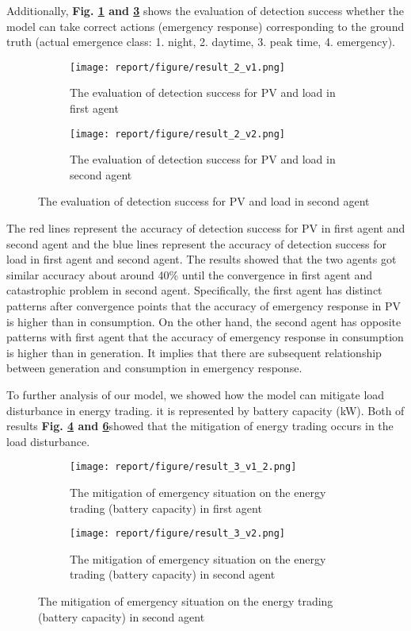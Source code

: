 \documentclass[conference]{IEEEtran}
\begin{document}
Additionally, \textbf{Fig. \ref{fig4} and \ref{fig5}} shows the evaluation of detection success whether the model can take correct actions (emergency response) corresponding to the ground truth (actual emergence class: 1. night, 2. daytime, 3. peak time, 4. emergency). 
\begin{figure}[htp]
\begin{subfigure}{0.45\columnwidth}
  \texttt{[image: report/figure/result\_2\_v1.png]}
  \caption{The evaluation of detection success for PV and load in first agent}
  \label{fig4}
\end{subfigure}
\hfill
\begin{subfigure}{0.45\columnwidth}
  \texttt{[image: report/figure/result\_2\_v2.png]}
  \caption{The evaluation of detection success for PV and load in second agent}
  \label{fig5}
\end{subfigure}
\end{figure}
The red lines represent the accuracy of detection success for PV in first agent and second agent and the blue lines represent the accuracy of detection success for load in first agent and second agent. The results showed that the two agents got similar accuracy about around 40\% until the convergence in first agent and catastrophic problem in second agent. Specifically, the first agent has distinct patterns after convergence points that the accuracy of emergency response in PV is higher than in consumption. On the other hand, the second agent has opposite patterns with first agent that the accuracy of emergency response in consumption is higher than in generation. It implies that there are subsequent relationship between generation and consumption in emergency response. 

To further analysis of our model, we showed how the model can mitigate load disturbance in energy trading. it is represented by battery capacity (kW). Both of results \textbf{Fig. \ref{fig6} and \ref{fig7}}showed that the mitigation of energy trading occurs in the load disturbance.

\begin{figure}[htp]
\begin{subfigure}{0.45\columnwidth}
  \texttt{[image: report/figure/result\_3\_v1\_2.png]}
  \caption{The mitigation of emergency situation on the energy trading (battery capacity) in first agent}
  \label{fig6}
\end{subfigure}
\hfill
\begin{subfigure}{0.45\columnwidth}
  \texttt{[image: report/figure/result\_3\_v2.png]}
  \caption{The mitigation of emergency situation on the energy trading (battery capacity) in second agent}
  \label{fig7}
\end{subfigure}
\end{figure}
\end{document}
